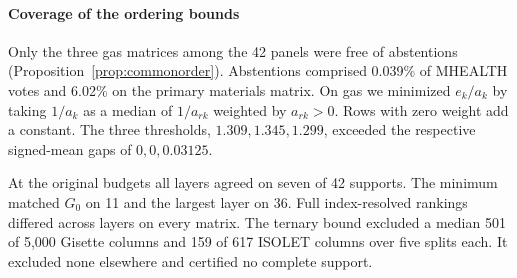 \paragraph{Coverage of the ordering bounds}
Only the three gas matrices among the 42 panels were free of abstentions (Proposition~\ref{prop:commonorder}). Abstentions comprised 0.039\% of MHEALTH votes and 6.02\% on the primary materials matrix. On gas we minimized $e_k/a_k$ by taking $1/a_k$ as a median of $1/a_{rk}$ weighted by $a_{rk}>0$. Rows with zero weight add a constant. The three thresholds, $1.309,1.345,1.299$, exceeded the respective signed-mean gaps of $0,0,0.03125$.

At the original budgets all layers agreed on seven of 42 supports. The minimum matched $G_0$ on 11 and the largest layer on 36. Full index-resolved rankings differed across layers on every matrix. The ternary bound excluded a median 501 of 5,000 Gisette columns and 159 of 617 ISOLET columns over five splits each. It excluded none elsewhere and certified no complete support.
